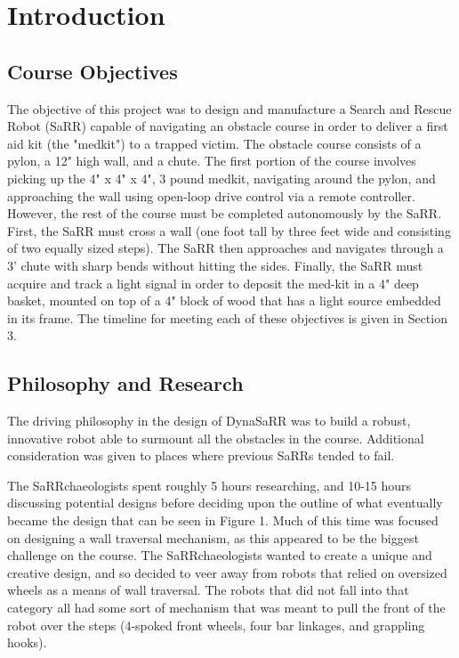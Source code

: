 \section{Introduction}

\subsection{Course Objectives}
The objective of this project was to design and manufacture a Search and Rescue Robot (SaRR) capable of navigating an obstacle course in order to deliver a first aid kit (the "medkit") to a trapped victim. The obstacle course consists of a pylon, a 12" high wall, and a chute. The first portion of the course involves picking up the 4" x 4" x 4", 3 pound medkit, navigating around the pylon, and approaching the wall using open-loop drive control via a remote controller. However, the rest of the course must be completed autonomously by the SaRR. First, the SaRR must cross a wall (one foot tall by three feet wide and consisting of two equally sized steps). The SaRR then approaches and navigates through a 3' chute with sharp bends without hitting the sides. Finally, the SaRR must acquire and track a light signal in order to deposit the med-kit in a 4" deep basket, mounted on top of a 4" block of wood that has a light source embedded in its frame. The timeline for meeting each of these objectives is given in Section 3. 


\subsection{Philosophy and Research}
The driving philosophy in the design of DynaSaRR was to build a robust, innovative robot able to surmount all the obstacles in the course. Additional consideration was given to places where previous SaRRs tended to fail.

The SaRRchaeologists spent roughly 5 hours researching, and 10-15 hours discussing potential designs before deciding upon the outline of what eventually became the design that can be seen in Figure 1. Much of this time was focused on designing a wall traversal mechanism, as this appeared to be the biggest challenge on the course. The SaRRchaeologists wanted to create a unique and creative design, and so decided to veer away from robots that relied on oversized wheels as a means of wall traversal. The robots that did not fall into that category all had some sort of mechanism that was meant to pull the front of the robot over the steps (4-spoked front wheels, four bar linkages, and grappling hooks).

